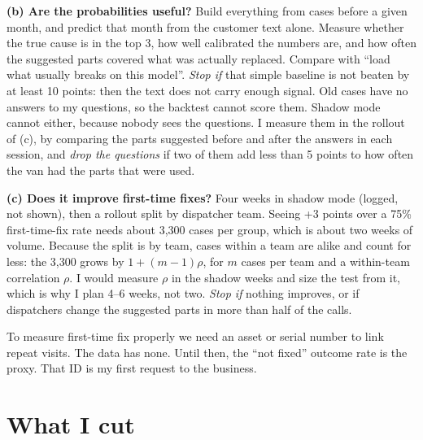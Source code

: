 \documentclass[11pt,a4paper]{article}
\begin{document}
\textbf{(b) Are the probabilities useful?} Build everything from cases before a given month, and predict that month from the customer text alone. Measure whether the true cause is in the top 3, how well calibrated the numbers are, and how often the suggested parts covered what was actually replaced. Compare with “load what usually breaks on this model”. \emph{Stop if} that simple baseline is not beaten by at least 10 points: then the text does not carry enough signal. Old cases have no answers to my questions, so the backtest cannot score them. Shadow mode cannot either, because nobody sees the questions. I measure them in the rollout of (c), by comparing the parts suggested before and after the answers in each session, and \emph{drop the questions} if two of them add less than 5 points to how often the van had the parts that were used.

\textbf{(c) Does it improve first-time fixes?} Four weeks in shadow mode (logged, not shown), then a rollout split by dispatcher team. Seeing +3 points over a 75\% first-time-fix rate needs about 3,300 cases per group, which is about two weeks of volume. Because the split is by team, cases within a team are alike and count for less: the 3,300 grows by $1 + (m-1)\rho$, for $m$ cases per team and a within-team correlation $\rho$. I would measure $\rho$ in the shadow weeks and size the test from it, which is why I plan 4--6 weeks, not two. \emph{Stop if} nothing improves, or if dispatchers change the suggested parts in more than half of the calls.

To measure first-time fix properly we need an asset or serial number to link repeat visits. The data has none. Until then, the “not fixed” outcome rate is the proxy. That ID is my first request to the business.

\section{What I cut}\label{sec:cut}
\end{document}
